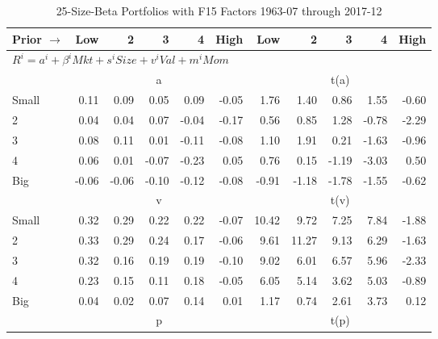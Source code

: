 
\begin{table}[!ht]
\footnotesize
\centering
\caption{25-Size-Beta Portfolios with F15 Factors 1963-07 through 2017-12}
\begin{tabular}{lrrrrrrrrrr}
  \toprule
    Prior $\rightarrow$ & Low & 2 & 3 & 4 & High & Low & 2 & 3 & 4 & High \\ 
  \midrule
  \multicolumn{11}{l}{$R^i=a^i+\beta^iMkt+s^iSize+v^iVal+m^iMom$} \\

  
    
      & \multicolumn{5}{c}{a} & \multicolumn{5}{c}{t(a)}
    
    \\
      \cmidrule(r){2-6} \cmidrule(r){7-11}

    Small   & 0.11  & 0.09  & 0.05  & 0.09  & -0.05  & 1.76  & 1.40  & 0.86  & 1.55  & -0.60  \\
         2  & 0.04  & 0.04  & 0.07  & -0.04  & -0.17  & 0.56  & 0.85  & 1.28  & -0.78  & -2.29  \\
         3  & 0.08  & 0.11  & 0.01  & -0.11  & -0.08  & 1.10  & 1.91  & 0.21  & -1.63  & -0.96  \\
         4  & 0.06  & 0.01  & -0.07  & -0.23  & 0.05  & 0.76  & 0.15  & -1.19  & -3.03  & 0.50  \\
    Big     & -0.06  & -0.06  & -0.10  & -0.12  & -0.08  & -0.91  & -1.18  & -1.78  & -1.55  & -0.62  \\

  
    
      & \multicolumn{5}{c}{v} & \multicolumn{5}{c}{t(v)}
    
    \\
      \cmidrule(r){2-6} \cmidrule(r){7-11}

    Small   & 0.32  & 0.29  & 0.22  & 0.22  & -0.07  & 10.42  & 9.72  & 7.25  & 7.84  & -1.88  \\
         2  & 0.33  & 0.29  & 0.24  & 0.17  & -0.06  & 9.61  & 11.27  & 9.13  & 6.29  & -1.63  \\
         3  & 0.32  & 0.16  & 0.19  & 0.19  & -0.10  & 9.02  & 6.01  & 6.57  & 5.96  & -2.33  \\
         4  & 0.23  & 0.15  & 0.11  & 0.18  & -0.05  & 6.05  & 5.14  & 3.62  & 5.03  & -0.89  \\
    Big     & 0.04  & 0.02  & 0.07  & 0.14  & 0.01  & 1.17  & 0.74  & 2.61  & 3.73  & 0.12  \\

  
    
      & \multicolumn{5}{c}{p} & \multicolumn{5}{c}{t(p)}
    

\end{tabular}
\end{table}

